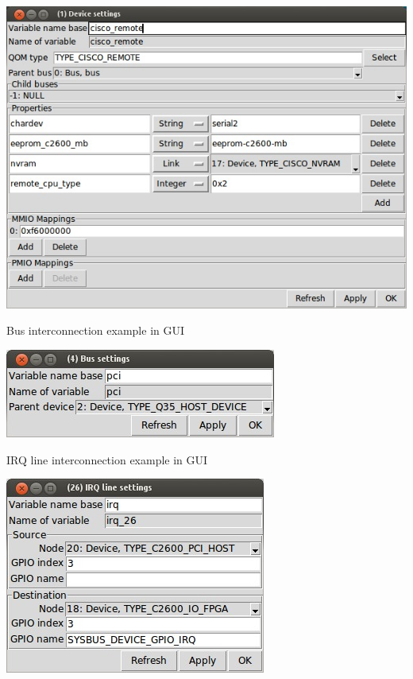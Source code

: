 \documentclass[unicode,hyperref={unicode=true},aspectratio=169]{beamer}
\begin{document}
\begin{frame}
\begin{center}
\includegraphics[height=0.98\textheight]{REMOTE.jpg}
\end{center}
\end{frame}



\begin{frame}{Bus interconnection example in GUI}
\begin{center}
\includegraphics[width=0.7\linewidth]{bus_widget.jpg}
\end{center}
\end{frame}



\begin{frame}{IRQ line interconnection example in GUI}
\begin{center}
\includegraphics[height=0.8\textheight]{irq_widget.jpg}
\end{center}
\end{frame}
\end{document}
